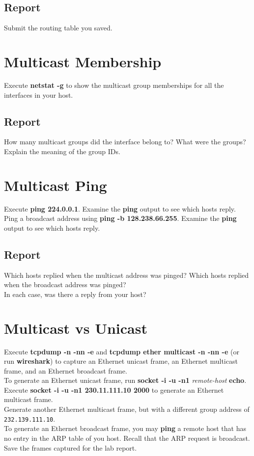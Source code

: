 \documentclass[10pt,a4paper]{article}
\numberwithin{equation}{section}
\numberwithin{figure}{section}
\numberwithin{table}{section}
\begin{document}
    \subsection*{Report}
    Submit the routing table you saved.

\section{Multicast Membership}
    Execute \textbf{netstat -g} to show the multicast group memberships for all the interfaces in your host.
    \subsection*{Report}
    How many multicast groups did the interface belong to? What were the groups? Explain the meaning of the group IDs.

\section{Multicast Ping}
    Execute \textbf{ping 224.0.0.1}.
    Examine the \textbf{ping} output to see which hosts reply. \\
    Ping a broadcast address using \textbf{ping -b 128.238.66.255}.
    Examine the \textbf{ping} output to see which hosts reply. \\
    \subsection*{Report}
    Which hosts replied when the multicast address was pinged?
    Which hosts replied when the broadcast address was pinged? \\
    In each case, was there a reply from your host?

\section{Multicast vs Unicast}
    Execute \textbf{tcpdump -n -nn -e} and \textbf{tcpdump ether multicast -n -nn -e} (or run \textbf{wireshark}) to capture an Ethernet unicast frame, an Ethernet multicast frame, and an Ethernet broadcast frame. \\
    To generate an Ethernet unicast frame, run \textbf{socket -i -u -n1} \textit{remote-host} \textbf{echo}. \\
    Execute \textbf{socket -i -u -n1 230.11.111.10 2000} to generate an Ethernet multicast frame. \\
    Generate another Ethernet multicast frame, but with a different group address of \texttt{232.139.111.10}. \\
    To generate an Ethernet broadcast frame, you may \textbf{ping} a remote host that has no entry in the ARP table of you host.
    Recall that the ARP request is broadcast. \\
    Save the frames captured for the lab report.
\end{document}
